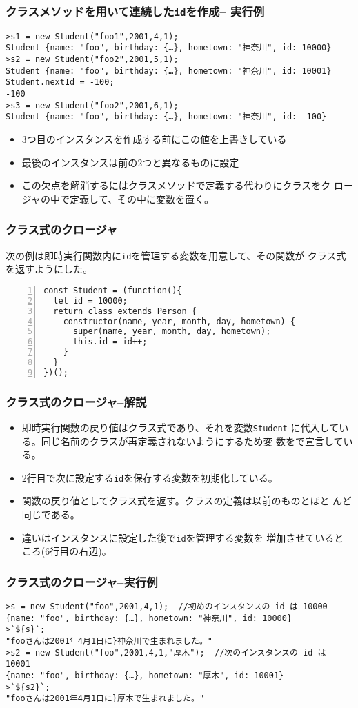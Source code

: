 \begin{frame}[containsverbatim]
 \frametitle{クラスメソッドを用いて連続した\protect\texttt{id}を作成--
 実行例}
 {\scriptsize
\begin{Verbatim}
>s1 = new Student("foo1",2001,4,1);
Student {name: "foo", birthday: {…}, hometown: "神奈川", id: 10000}
>s2 = new Student("foo2",2001,5,1);
Student {name: "foo", birthday: {…}, hometown: "神奈川", id: 10001}
Student.nextId = -100;
-100
>s3 = new Student("foo2",2001,6,1);
Student {name: "foo", birthday: {…}, hometown: "神奈川", id: -100}
\end{Verbatim}
 }
 \begin{itemize}
  \item 3つ目のインスタンスを作成する前にこの値を上書きしている
  \item 最後のインスタンスは前の2つと異なるものに設定
  \item この欠点を解消するにはクラスメソッドで定義する代わりにクラスをク
        ロージャの中で定義して、その中に変数を置く。
 \end{itemize}
 \end{frame}
\begin{frame}[containsverbatim]
 \frametitle{クラス式のクロージャ}
次の例は即時実行関数内に\texttt{id}を管理する変数を用意して、その関数が
 クラス式を返すようにした。
 {\scriptsize
\begin{Verbatim}[numbers=left]
const Student = (function(){
  let id = 10000;
  return class extends Person {
    constructor(name, year, month, day, hometown) {
      super(name, year, month, day, hometown);
      this.id = id++;
    }
  }
})();
\end{Verbatim}
 }
\end{frame}
\begin{frame}[containsverbatim]
 \frametitle{クラス式のクロージャ--解説}
 \begin{itemize}
  \item 即時実行関数の戻り値はクラス式であり、それを変数\texttt{Student}
        に代入している。同じ名前のクラスが再定義されないようにするため変
        数をで宣言している。
  \item 2行目で次に設定する\texttt{id}を保存する変数を初期化している。
  \item 関数の戻り値としてクラス式を返す。クラスの定義は以前のものとほと
        んど同じである。
  \item 違いはインスタンスに設定した後で\texttt{id}を管理する変数を
        増加させているところ(6行目の右辺)。
 \end{itemize}
 \end{frame}
\begin{frame}[containsverbatim]
 \frametitle{クラス式のクロージャ--実行例}
 {\scriptsize
\begin{Verbatim}
>s = new Student("foo",2001,4,1);  //初めのインスタンスの id は 10000
{name: "foo", birthday: {…}, hometown: "神奈川", id: 10000}
>`${s}`;
"fooさんは2001年4月1日に}神奈川で生まれました。"
>s2 = new Student("foo",2001,4,1,"厚木");  //次のインスタンスの id は 10001
{name: "foo", birthday: {…}, hometown: "厚木", id: 10001}
>`${s2}`;
"fooさんは2001年4月1日に}厚木で生まれました。"
\end{Verbatim}
 }
 \end{frame}

\begin{frame}[containsverbatim]
 \frametitle{}
 \end{frame}
